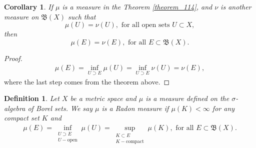 \documentclass[11pt]{book}
\newtheorem{definition}{Definition}[chapter]
\newtheorem{corollary}{Corollary}[theorem]
\theoremstyle{definition}
\numberwithin{equation}{chapter}
\begin{document}
\medskip

\begin{corollary}\label{coro_191}
If $\mu$ is a measure in the Theorem \ref{theorem_114}, and $\nu$ is another measure on $\mathfrak{B}(X)$ such that 
$$\mu(U) = \nu(U),\,\, \text{for all open sets}\,\, U \subset X,$$ 
 then 
$$\mu(E) = \nu(E),\,\, \text{for all}\,\, E \subset \mathfrak{B}(X).$$
\end{corollary}
\begin{proof}
\begin{align*}
    \mu(E) = \inf_{U \supset E} \mu(U) = \inf_{U \supset E} \nu(U) = \nu(E),
\end{align*}
where the last step comes from the theorem above.
\end{proof}

\medskip

\begin{definition}
Let $X$ be a metric space and $\mu$ is a measure defined on the $\sigma$-algebra of Borel sets. We say $\mu$ is a Radon measure if $\mu(K) < \infty$ for any compact set $K$ and 
\begin{align*}
    \mu(E) = \inf_{\substack{U \supset E\\ U - \text{open}}} \mu(U) = \sup_{\substack{K \subset E\\ K - \text{compact}}} \mu(K), \,\, \text{for all}\,\, E \subset \mathfrak{B}(X).
\end{align*}
\end{definition}

\medskip
\end{document}
